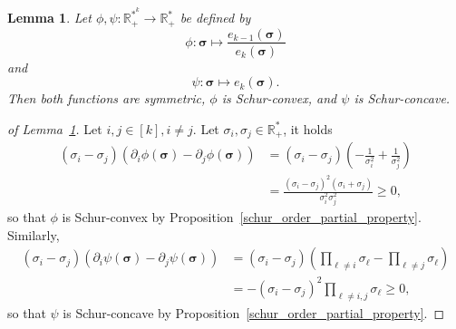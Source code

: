 \documentclass[twoside,11pt]{book}
\newtheorem{lemma}{Lemma}
\numberwithin{theorem}{chapter}
\numberwithin{definition}{chapter}
\numberwithin{proposition}{chapter}
\numberwithin{corollary}{chapter}
\numberwithin{example}{chapter}
\numberwithin{lemma}{chapter}
\numberwithin{assumption}{chapter}
\numberwithin{equation}{chapter}
\numberwithin{figure}{chapter}
\begin{document}
\begin{lemma}\label{symmetric_schur_convex_lemma}
Let $\phi, \psi:\mathbb{R}_{+}^{*^{k}} \rightarrow \mathbb{R}_{+}^{*}$ be defined by
\begin{equation}
\phi :  \bm{\sigma} \mapsto \frac{\displaystyle e_{k-1}(\bm{\sigma})}{\displaystyle e_{k}(\bm{\sigma})}
\end{equation}
and
\begin{equation}
\psi :  \bm{\sigma} \mapsto \displaystyle e_{k}(\bm{\sigma}).
\end{equation}
Then both functions are symmetric, $\phi$ is Schur-convex, and $\psi$ is Schur-concave.
\end{lemma}
\begin{proof}[of Lemma~\ref{symmetric_schur_convex_lemma}]
Let $i,j \in [k], i \neq j$. Let $\sigma_{i},\sigma_{j} \in \mathbb{R}_{+}^{*}$, it holds
\begin{align*}
    (\sigma_{i} - \sigma_{j})(\partial_{i}\phi(\bm{\sigma})-\partial_{j}\phi(\bm{\sigma})) & =  (\sigma_{i} - \sigma_{j})(-\frac{1}{\sigma_{i}^{2}} +\frac{1}{\sigma_{j}^{2}}) \\
    & = \frac{(\sigma_{i}-\sigma_{j})^{2}(\sigma_{i} +\sigma_{j})}{\sigma_{i}^{2}\sigma_{j}^{2}} \geq 0,%
\end{align*}
so that $\phi$ is Schur-convex by Proposition~\ref{schur_order_partial_property}. Similarly,
\begin{align*}
    (\sigma_{i} - \sigma_{j})(\partial_{i}\psi(\bm{\sigma})-\partial_{j}\psi(\bm{\sigma})) & =  (\sigma_{i} - \sigma_{j})(\prod_{\ell \neq i}\sigma_{\ell} - \prod_{\ell \neq j}\sigma_{\ell}) \\
    & = -(\sigma_{i}-\sigma_{j})^{2}\prod_{\ell \neq i,j}\sigma_{\ell} \geq 0, %
\end{align*}
so that $\psi$ is Schur-concave by Proposition~\ref{schur_order_partial_property}.
\end{proof}
\end{document}
